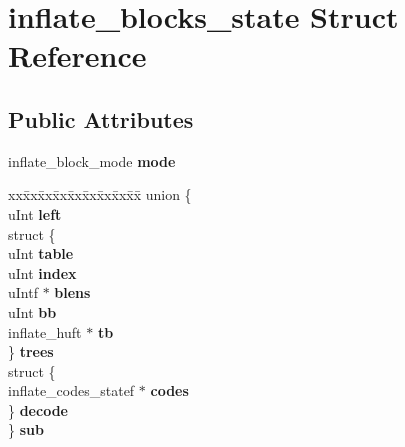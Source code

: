 \hypertarget{structinflate__blocks__state}{}\section{inflate\+\_\+blocks\+\_\+state Struct Reference}
\label{structinflate__blocks__state}
\subsection*{Public Attributes}
\begin{DoxyCompactItemize}
\item 
\mbox{\label{structinflate__blocks__state_a1854f32dadd0e66a483ac67800fe7728}} 
inflate\+\_\+block\+\_\+mode {\bfseries mode}
\item 
\mbox{\label{structinflate__blocks__state_a8d4ae85982043eada6ffa664c5b4bcfa}} 
\begin{tabbing}
xx\=xx\=xx\=xx\=xx\=xx\=xx\=xx\=xx\=\kill
union \{\\
\>uInt {\bfseries left}\\
\>struct \{\\
\>\>uInt {\bfseries table}\\
\>\>uInt {\bfseries index}\\
\>\>uIntf $\ast$ {\bfseries blens}\\
\>\>uInt {\bfseries bb}\\
\>\>inflate\_huft $\ast$ {\bfseries tb}\\
\>\} {\bfseries trees}\\
\>struct \{\\
\>\>inflate\_codes\_statef $\ast$ {\bfseries codes}\\
\>\} {\bfseries decode}\\
\} {\bfseries sub}\\


\end{tabbing}
\end{DoxyCompactItemize}
